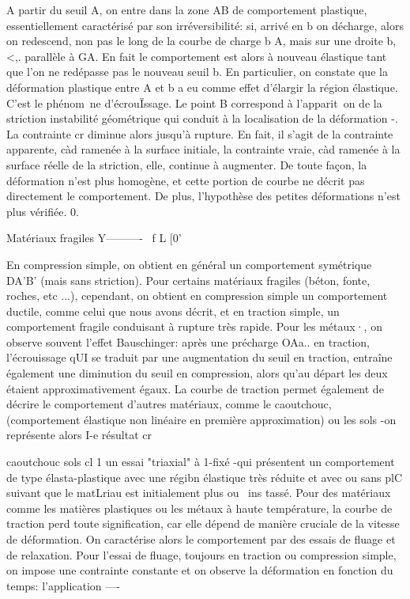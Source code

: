 A partir du seuil A, on entre dans la zone AB de comportement plastique, essentiellement caractérisé par son irréversibilité: si, arrivé en b on décharge, alors on redescend, non pas le long de la courbe de char­ge b A, mais sur une droite b,<,. parallèle à GA. En fait le comportement est alors à nouveau élastique tant que l'on ne redépasse pas le nouveau seuil 
b. En particulier, on constate que la déformation plastique entre A et b a eu comme effet d'élargir la région élastique. C'est le phénom~ne d'écrouÏs­sage. 
Le point B correspond à l'apparit~on de la striction instabilité géométrique qui conduit à la localisation de la déformation -. La contrainte cr diminue alors jusqu'à rupture. En fait, il s'agit de la contrainte appa­rente, càd ramenée à la surface initiale, la contrainte vraie, càd ramenée à la surface réelle de la striction, elle, continue à augmenter. De toute façon, la déformation n'est plus homogène, et cette portion de courbe ne décrit pas directement le comportement. De plus, l'hypothèse des petites dé­formations n'est plus vérifiée. 
0. 

Matériaux fragiles 
Y----------~ f L 
[0' 

En compression simple, on obtient en général un comportement symétrique DA'B' 
(mais sans striction). Pour certains matériaux fragiles (béton, fonte, roches, etc ...), cependant, on obtient en compression simple un comportement ductile, comme celui que nous avons décrit, et en traction simple, un comportement fragile conduisant à rupture très rapide. Pour les métaux·, on observe souvent l'effet Bauschinger: après une précharge OAa.. en traction, l'écrouissage qUI se traduit par une augmentation du seuil en traction, entraîne également une 
diminution du seuil en compression, alors qu'au départ les deux étaient approximativement égaux. La courbe de traction permet également de décrire le comportement d'autres matériaux, comme le caoutchouc, (comportement élastique non linéaire en première approximation) ou les sols -on représente alors I-e résultat 
cr 


caoutchouc sols 
cl 1 un essai "triaxial" à 1-fixé -qui présentent un comportement de type 
élasta-plastique avec une régibn élastique très réduite et avec ou sans plC 
suivant que le matLriau est initialement plus ou ~ins tassé. 
Pour des matériaux comme les matières plastiques ou les métaux à haute température, la courbe de traction perd toute signification, car elle dépend de manière cruciale de la vitesse de déformation. On caractérise alors le comportement par des essais de fluage et de relaxation. Pour l'essai de fluage, toujours en traction ou compression simple, on impose une contrainte constante et on observe la déformation en fonction du temps: l'application 
----­

